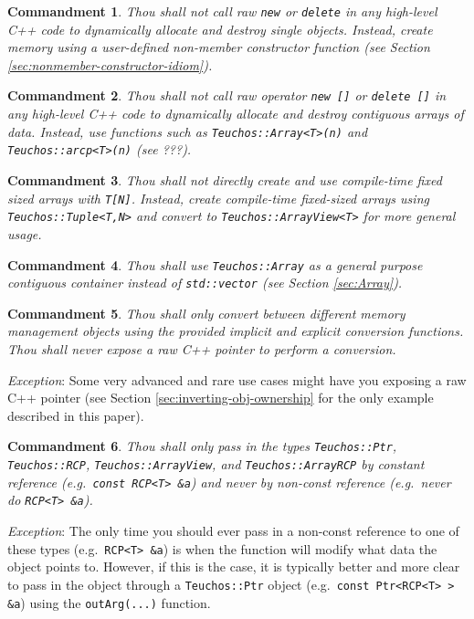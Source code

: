 \documentclass[pdf,ps2pdf,11pt]{SANDreport}
\newtheorem{commandment}{Commandment}
\begin{document}
\begin{commandment}
Thou shall not call raw {}\texttt{new} or {}\texttt{delete} in any
high-level C++ code to dynamically allocate and destroy single
objects.  Instead, create memory using a user-defined non-member
constructor function (see Section
{}\ref{sec:nonmember-constructor-idiom}).
\end{commandment}

\begin{commandment}
Thou shall not call raw operator {}\texttt{new []} or {}\texttt{delete
[]} in any high-level C++ code to dynamically allocate and destroy
contiguous arrays of data.  Instead, use functions such as
{}\texttt{Teuchos::Array<T>(n)} and {}\texttt{Teuchos::arcp<T>(n)}
(see ???).
\end{commandment}

\begin{commandment}
Thou shall not directly create and use compile-time fixed sized arrays
with {}\texttt{T[N]}.  Instead, create compile-time fixed-sized arrays
using {}\texttt{Teuchos::Tuple<T,N>} and convert to
{}\texttt{Teuchos::ArrayView<T>} for more general usage.
\end{commandment}

\begin{commandment}
Thou shall use {}\texttt{Teuchos::Array} as a general purpose
contiguous container instead of {}\texttt{std::vector} (see Section
{}\ref{sec:Array}).
\end{commandment}

\begin{commandment}
Thou shall only convert between different memory management objects
using the provided implicit and explicit conversion functions.  Thou
shall never expose a raw C++ pointer to perform a conversion.
\end{commandment}
{}\textit{Exception}: Some very advanced and rare use cases might have
you exposing a raw C++ pointer (see Section
{}\ref{sec:inverting-obj-ownership} for the only example described in
this paper).

\begin{commandment}
Thou shall only pass in the types {}\texttt{Teuchos::Ptr},
{}\texttt{Teuchos::RCP}, {}\texttt{Teuchos::ArrayView}, and
{}\texttt{Teuchos::ArrayRCP} by constant reference (e.g.\
{}\texttt{const RCP<T> \&a}) and never by non-const reference (e.g.\
never do {}\texttt{RCP<T> \&a}).
\end{commandment}
{}\textit{Exception}: The only time you should ever pass in a
non-const reference to one of these types (e.g.\ {}\texttt{RCP<T>
\&a}) is when the function will modify what data the object points to.
However, if this is the case, it is typically better and more clear to
pass in the object through a {}\texttt{Teuchos::Ptr} object (e.g.\
{}\texttt{const Ptr<RCP<T> > \&a}) using the {}\texttt{outArg(...)} 
function.
\end{document}
